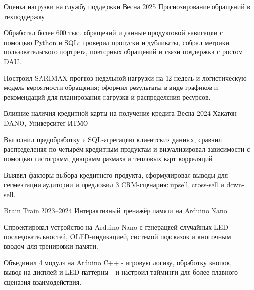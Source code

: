 \documentclass[10pt,a4paper]{article}
\begin{document}
{\begin{minipage}[t][\pagecontentheight]{\mainwidth}
\begin{minipage}[t][\maininnerheight]{\maininnerwidth}
    \MainEntry
      {Оценка нагрузки на службу поддержки}
      {Весна 2025}
      {Прогнозирование обращений в техподдержку}
      {}
      {\begin{mainbullets}
        \item Обработал более 600 тыс. обращений и данные продуктовой навигации с помощью Python и SQL; проверил пропуски и дубликаты, собрал метрики пользовательского портрета, повторных обращений и связи поддержки с ростом DAU.
        \item Построил SARIMAX-прогноз недельной нагрузки на 12 недель и логистическую модель вероятности обращения; оформил результаты в виде графиков и рекомендаций для планирования нагрузки и распределения ресурсов.
      \end{mainbullets}}

    \MainEntry
      {Влияние наличия кредитной карты на получение кредита}
      {Весна 2024}
      {Хакатон DANO, Университет ИТМО}
      {}
      {\begin{mainbullets}
        \item Выполнил предобработку и SQL-агрегацию клиентских данных, сравнил распределения по четырём кредитным продуктам и визуализировал зависимости с помощью гистограмм, диаграмм размаха и тепловых карт корреляций.
        \item Выявил факторы выбора кредитного продукта, сформулировал выводы для сегментации аудитории и предложил 3 CRM-сценария: upsell, cross-sell и down-sell.
      \end{mainbullets}}

    \MainEntry
      {Brain Train}
      {2023--2024}
      {Интерактивный тренажёр памяти на Arduino Nano}
      {}
      {\begin{mainbullets}
        \item Спроектировал устройство на Arduino Nano с генерацией случайных LED-последовательностей, OLED-индикацией, системой подсказок и кнопочным вводом для тренировки памяти.
        \item Объединил 4 модуля на Arduino C++ - игровую логику, обработку кнопок, вывод на дисплей и LED-паттерны - и настроил тайминги для более плавного сценария взаимодействия.
      \end{mainbullets}}

    \RightFooter{}
  \end{minipage}
\end{minipage}}
\end{document}
